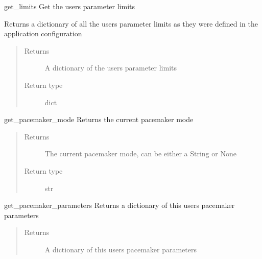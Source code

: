 \documentclass[letterpaper,10pt,english]{sphinxmanual}
\begin{document}
\begin{fulllineitems}

\begin{fulllineitems}
\label{\detokenize{index:data.user.User.get_limits}}
get\_limits Get the users parameter limits

Returns a dictionary of all the users parameter limits
as they were defined in the application configuration
\begin{quote}\begin{description}
\item[{Returns}] \leavevmode
A dictionary of the users parameter limits

\item[{Return type}] \leavevmode
dict

\end{description}\end{quote}

\end{fulllineitems}


\begin{fulllineitems}
\label{\detokenize{index:data.user.User.get_pacemaker_mode}}
get\_pacemaker\_mode Returns the current pacemaker mode
\begin{quote}\begin{description}
\item[{Returns}] \leavevmode
The current pacemaker mode, can be either a String or None

\item[{Return type}] \leavevmode
str

\end{description}\end{quote}

\end{fulllineitems}


\begin{fulllineitems}
\label{\detokenize{index:data.user.User.get_pacemaker_parameters}}
get\_pacemaker\_parameters Returns a dictionary of this users pacemaker parameters
\begin{quote}\begin{description}
\item[{Returns}] \leavevmode
A dictionary of this users pacemaker parameters


\end{description}
\end{quote}
\end{fulllineitems}
\end{fulllineitems}
\end{document}
